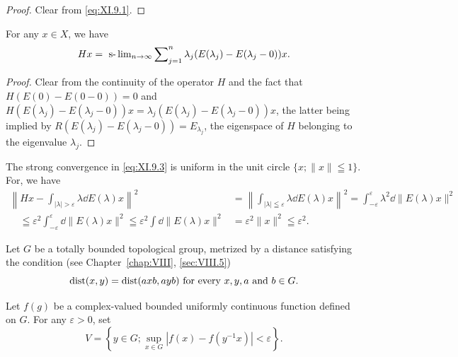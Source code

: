 \begin{proof}
 Clear from \eqref{eq:XI.9.1}. 
\end{proof}

\begin{corollary}\label{cor:XI.9.Corollary.2} For any $x \in X$, we have 
\begin{equation}\label{eq:XI.9.3}
H x = \underset {n \rightarrow \infty} {\text{ \slim }} \sum\limits_{j=1} ^{n} \lambda_{j} (E (\lambda_{j}) - E (\lambda_{j} - 0)) x.
\end{equation}
\end{corollary}

\begin{proof}
 Clear from the continuity of the operator $H$ and the fact that $H(E(0)-E(0-0))=0$ and $H(E(\lambda_{j})-E(\lambda_{j}-0))x=\lambda_{j}(E(\lambda_{j})-E(\lambda_{j}-0))x$, the latter being implied by $R(E(\lambda_{j})-E(\lambda_{j}-0))=E_{\lambda_{j}}$, the eigenspace of $H$ belonging to the eigenvalue $\lambda_{j}$. 
\end{proof}

\begin{remarku} The strong convergence in \eqref{eq:XI.9.3} is uniform in the unit circle $\{x; \| x \| \leqq 1\}$. For, we have 
\[
\begin{aligned}
\left\| H x - \int_{| \lambda | > \varepsilon} \lambda \dd E (\lambda) x \right\| ^{2} &= \left\| \int_{| \lambda | \leqq \varepsilon} \lambda \dd E (\lambda) x \right\| ^{2} = \int_{- \varepsilon} ^{\varepsilon} \lambda^{2} \dd \| E (\lambda) x \| ^{2}
\\
\quad \leqq \varepsilon^{2} \int_{- \varepsilon} ^{\varepsilon} \dd \| E (\lambda) x \| ^{2} \leqq \varepsilon^{2} \int \dd \| E (\lambda) x \| ^{2} &= \varepsilon^{2} \| x \| ^{2} \leqq \varepsilon^{2}.
\end{aligned}
\]
\end{remarku}


\label{sec:XI.10}

Let $G$ be a totally bounded topological group, metrized by a distance satisfying the condition (see Chapter~\ref{chap:VIII}, \ref{sec:VIII.5}) 
\begin{equation}\label{eq:XI.10.1}
\operatorname{dist} (x, y) = \operatorname{dist} (a x b, a y b) \text{ for every } x, y, a \text{ and } b \in G.
\end{equation}

Let $f(g)$ be a complex-valued bounded uniformly continuous function defined on $G$. For any $\varepsilon > 0$, set 
\begin{equation}\label{eq:XI.10.2}
V = \left\{y \in G; \sup\limits _{x \in G} | f (x) - f (y ^{-1} x) | < \varepsilon \right\}.
\end{equation}


